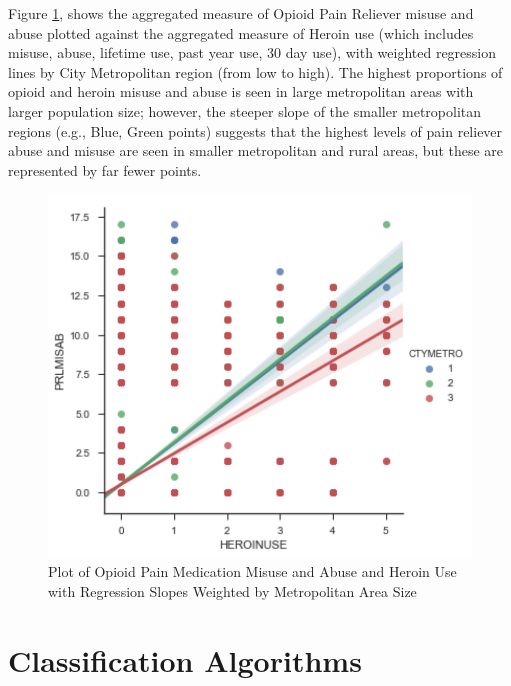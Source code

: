 \documentclass[sigconf]{acmart}
\begin{document}
Figure \ref{f:Figure2}, shows the aggregated measure of Opioid Pain Reliever 
misuse and abuse plotted against the aggregated measure of Heroin use (which
includes misuse, abuse, lifetime use, past year use, 30 day use), with
weighted regression lines by City Metropolitan region (from low to high). 
The highest proportions of opioid and heroin misuse and abuse is seen in 
large metropolitan areas with larger population size; however, the steeper
slope of the smaller metropolitan regions (e.g., Blue, Green points)
suggests that the highest levels of pain reliever abuse and misuse are
seen in smaller metropolitan and rural areas, but these are represented
by far fewer points. 

\begin{figure}[!ht]
  \centering\includegraphics[width=\columnwidth]{images/Figure2.pdf}
  \caption{Plot of Opioid Pain Medication Misuse and Abuse and Heroin Use
  with Regression Slopes Weighted by Metropolitan Area Size}
  \label{f:Figure2}
\end{figure}


\section{Classification Algorithms}

\cite{muller17}


\cite{raschka17}
\end{document}
